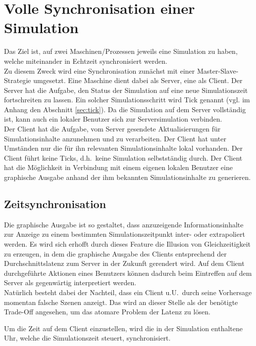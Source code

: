 \section{Volle Synchronisation einer Simulation}
Das Ziel ist, auf zwei Maschinen/Prozessen jeweils eine Simulation zu haben, welche miteinander in Echtzeit synchronisiert werden.\\
Zu diesem Zweck wird eine Synchronisation zunächst mit einer Master-Slave-Strategie umgesetzt. Eine Maschine dient dabei als Server, eine als Client.
Der Server hat die Aufgabe, den Status der Simulation auf eine neue Simulationszeit fortschreiten zu lassen. Ein solcher Simulationsschritt wird Tick genannt (vgl. im Anhang den Abschnitt \ref{sec:tick}). Da die Simulation auf dem Server vollständig ist, kann auch ein lokaler Benutzer sich zur Serversimulation verbinden.\\
Der Client hat die Aufgabe, vom Server gesendete Aktualisierungen für Simulationsinhalte anzunehmen und zu verarbeiten. Der Client hat unter Umständen nur die für ihn relevanten Simulationsinhalte lokal vorhanden. Der Client führt keine Ticks, d.h.~keine Simulation selbstständig durch. Der Client hat die Möglichkeit in Verbindung mit einem eigenen lokalen Benutzer eine graphische Ausgabe anhand der ihm bekannten Simulationsinhalte zu generieren. 

\subsection{Zeitsynchronisation}
Die graphische Ausgabe ist so gestaltet, dass anzuzeigende Informationsinhalte zur Anzeige zu einem bestimmten Simulationszeitpunkt inter- oder extrapoliert werden.
Es wird sich erhofft durch dieses Feature die Illusion von Gleichzeitigkeit zu erzeugen, in dem die graphische Ausgabe des Clients entsprechend der Durchschnittslatenz zum Server in der Zukunft gerendert wird. Auf dem Client durchgeführte Aktionen eines Benutzers können dadurch beim Eintreffen auf dem Server als gegenwärtig interpretiert werden.\\
Natürlich besteht dabei der Nachteil, dass ein Client u.U.~durch seine Vorhersage momentan falsche Szenen anzeigt. Das wird an dieser Stelle als der benötigte Trade-Off angesehen, um das atomare Problem der Latenz zu lösen.

Um die Zeit auf dem Client einzustellen, wird die in der Simulation enthaltene Uhr, welche die Simulationszeit steuert, synchronisiert.


